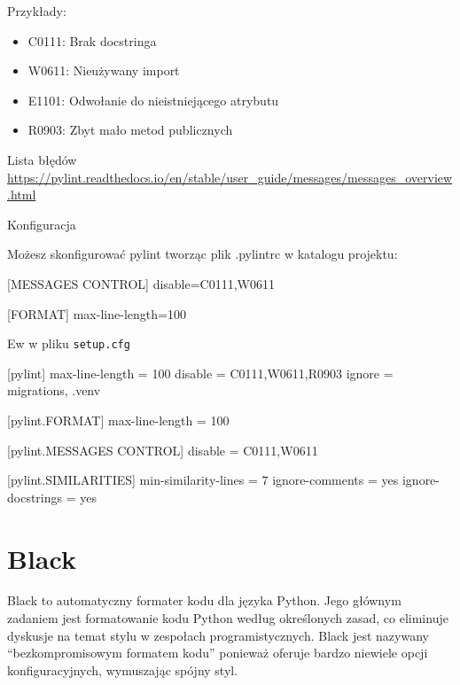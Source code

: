 \documentclass[
  polish,
  letterpaper,
  DIV=11,
  numbers=noendperiod]{scrreprt}
\newenvironment{Shaded}{\begin{snugshade}}{\end{snugshade}}
\newcommand{\NormalTok}[1]{\textcolor[rgb]{0.00,0.23,0.31}{#1}}
\providecommand{\tightlist}{%
  \setlength{\itemsep}{0pt}\setlength{\parskip}{0pt}}
\begin{document}
Przykłady:

\begin{itemize}
\tightlist
\item
  C0111: Brak docstringa
\item
  W0611: Nieużywany import
\item
  E1101: Odwołanie do nieistniejącego atrybutu
\item
  R0903: Zbyt mało metod publicznych
\end{itemize}

Lista błędów
\url{https://pylint.readthedocs.io/en/stable/user_guide/messages/messages_overview.html}

Konfiguracja

Możesz skonfigurować pylint tworząc plik .pylintrc w katalogu projektu:

\begin{Shaded}
\begin{Highlighting}[]
\NormalTok{[MESSAGES CONTROL]}
\NormalTok{disable=C0111,W0611}

\NormalTok{[FORMAT]}
\NormalTok{max{-}line{-}length=100}
\end{Highlighting}
\end{Shaded}

Ew w pliku \texttt{setup.cfg}

\begin{Shaded}
\begin{Highlighting}[]
\NormalTok{[pylint]}
\NormalTok{max{-}line{-}length = 100}
\NormalTok{disable = C0111,W0611,R0903}
\NormalTok{ignore = migrations, .venv}

\NormalTok{[pylint.FORMAT]}
\NormalTok{max{-}line{-}length = 100}

\NormalTok{[pylint.MESSAGES CONTROL]}
\NormalTok{disable = C0111,W0611}

\NormalTok{[pylint.SIMILARITIES]}
\NormalTok{min{-}similarity{-}lines = 7}
\NormalTok{ignore{-}comments = yes}
\NormalTok{ignore{-}docstrings = yes}
\end{Highlighting}
\end{Shaded}

\section{Black}\label{black}

Black to automatyczny formater kodu dla języka Python. Jego głównym
zadaniem jest formatowanie kodu Python według określonych zasad, co
eliminuje dyskusje na temat stylu w zespołach programistycznych. Black
jest nazywany ``bezkompromisowym formatem kodu'' ponieważ oferuje bardzo
niewiele opcji konfiguracyjnych, wymuszając spójny styl.
\end{document}
